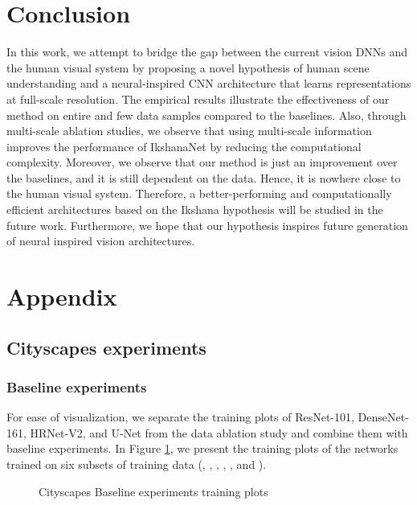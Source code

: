 \documentclass{article}
\begin{document}
\section{Conclusion}
\label{6}
In this work, we attempt to bridge the gap between the current vision DNNs and the human visual system by proposing a novel hypothesis of human scene understanding and a  neural-inspired CNN architecture that learns representations at full-scale resolution.\newline
The empirical results illustrate the effectiveness of our method on entire and few data samples compared to the baselines. Also, through multi-scale ablation studies, we observe that using multi-scale information improves the performance of IkshanaNet by reducing the computational complexity.\newline
Moreover, we observe that our method is just an improvement over the baselines, and it is still dependent on the data. Hence, it is nowhere close to the human visual system. Therefore, a better-performing and computationally efficient architectures based on the Ikshana hypothesis will be studied in the future work.\newline
Furthermore, we hope that our hypothesis inspires future generation of neural inspired vision architectures. 

 




\newpage

\appendix

\section{Appendix}
\subsection{Cityscapes experiments}
\subsubsection{Baseline experiments}
For ease of visualization, we separate the training plots of ResNet-101, DenseNet-161,  HRNet-V2, and U-Net from the data ablation study and combine them with baseline experiments. In Figure \ref{C1}, we present the training plots of the networks trained on six subsets of training data (, , , , , and ).

\begin{figure}[ht]
\centering     {}
\caption{Cityscapes Baseline experiments training plots}
\label{C1}
\end{figure}
\end{document}
